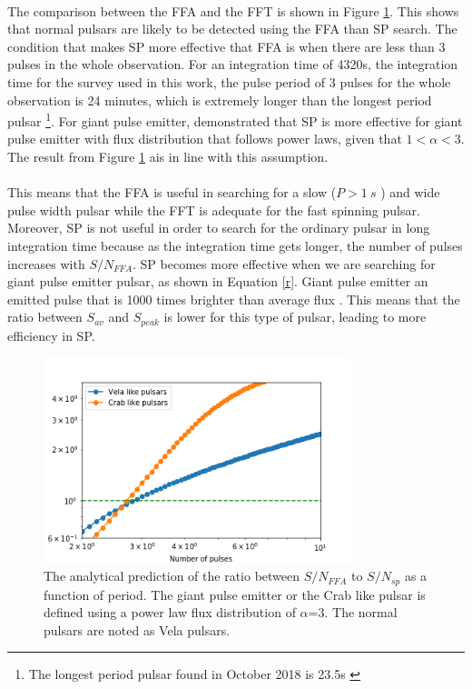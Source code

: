 \documentclass[thesis_msc.tex]{subfiles}
\begin{document}
  \paragraph{} The comparison between the FFA and the FFT is shown in Figure \ref{FFA_SP_com}. This shows that normal pulsars are likely to be detected using the FFA than SP search.  The condition that makes SP more effective that FFA is when there are less than 3 pulses in the whole observation. For an integration time of 4320s, the integration time for the survey used in this work, the pulse period of 3 pulses for the whole observation is 24 minutes, which is extremely longer than the longest period pulsar \footnote{The longest period pulsar found in October 2018 is 23.5s \cite{tan2018lofar} }.  For giant pulse emitter, \cite{keane2011transient} demonstrated that SP is more effective for giant pulse emitter with flux distribution that follows power laws, given that $1<\alpha<3$.  The result from Figure \ref{FFA_SP_com} ais in line with this assumption.  
  
  \paragraph{} This means that the FFA is useful in searching for a slow ($P>1~s$ ) and wide pulse width pulsar while the FFT is adequate for the fast spinning pulsar. Moreover, SP is not useful in order to search for the ordinary pulsar in long integration time because as the integration time gets longer, the number of pulses increases with $S/N_{FFA}$.  SP becomes more effective when we are searching for giant pulse emitter pulsar, as shown in Equation \ref{r}.  Giant pulse emitter an emitted pulse that is 1000 times brighter than average flux \citep{karuppusamy2010giant}.  This means that the ratio between $S_{av}$ and $S_{peak}$ is lower for this type of pulsar, leading to more efficiency in SP. 


  \begin{figure}[h] \centering
\includegraphics[width=0.80\textwidth]{figures/FFA_SP}
\caption{The analytical prediction of the ratio between $S/N_{FFA}$ to $S/N_{sp}$ as a function of period.  The giant pulse emitter or the Crab like pulsar is defined using a power law flux distribution of $\alpha$=3. The normal pulsars are noted as Vela pulsars.}
\label{FFA_SP_com}
\end{figure}
  
\end{document}
